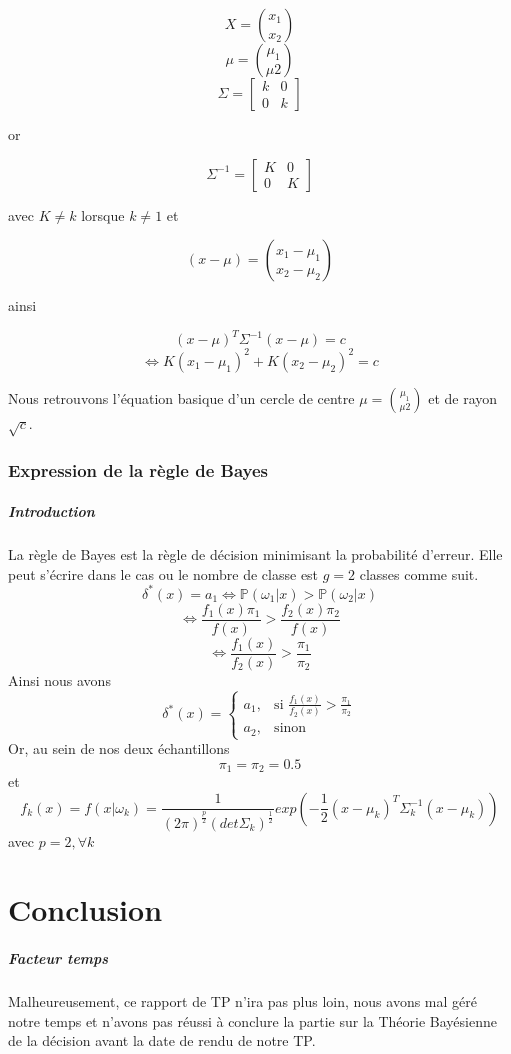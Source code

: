 \documentclass{report}
\begin{document}
$$ X = \binom{x_1}{x_2} $$
$$ \mu = \binom{\mu_1}{\mu2}$$
$$ \Sigma = \begin{bmatrix} k & 0\\ 0 & k \end{bmatrix}$$

or

$$ \Sigma^{-1} = \begin{bmatrix} K & 0\\ 0 & K \end{bmatrix}$$

avec $K \neq k$ lorsque $k \neq 1$ et

$$(x - \mu) = \binom{x_1 - \mu_1}{x_2 - \mu_2}$$

ainsi

$$(x - \mu)^T\Sigma^{-1}(x - \mu) = c$$
$$\Leftrightarrow K(x_1 - \mu_1)^2 + K(x_2 - \mu_2)^2 = c$$

Nous retrouvons l'équation basique d'un cercle de centre $\mu = \binom{\mu_1}{\mu2}$ et de rayon $\sqrt{c}$.

\subsection{Expression de la règle de Bayes}
\paragraph{Introduction}
La règle de Bayes est la règle de décision minimisant la probabilité d'erreur. Elle peut s'écrire dans le cas ou le nombre de classe est $g = 2$ classes comme suit.
$$\delta^{*}(x) = a_1 \Leftrightarrow \mathbb{P}(\omega_1 | x) > \mathbb{P} (\omega_2 | x)$$
$$\Leftrightarrow \frac{f_1(x) \pi_1}{f(x)} > \frac{f_2(x) \pi_2}{f(x)}$$
$$\Leftrightarrow \frac{f_1(x)}{f_2(x)} > \frac{\pi_1}{\pi_2}$$
Ainsi nous avons
$$\delta^{*}(x) =
    \begin{cases}
        a_1, & \text{si }\frac{f_1(x)}{f_2(x)} > \frac{\pi_1}{\pi_2} \\
        a_2, & \text{sinon}
    \end{cases}
$$
Or, au sein de nos deux échantillons
$$\pi_1 = \pi_2 = 0.5$$
et
$$f_k(x) = f(x | \omega_k) = \frac{1}{(2\pi)^{\frac{p}{2}}(det \Sigma_k)^{\frac{1}{2}}}exp(-\frac{1}{2}(x - \mu_k)^T\Sigma_k^{-1}(x - \mu_k))$$
avec $p = 2, \forall k$


\chapter{Conclusion}
\paragraph{Facteur temps}
Malheureusement, ce rapport de TP n'ira pas plus loin, nous avons mal géré notre temps et n'avons pas réussi à conclure la partie sur la Théorie Bayésienne de la décision avant la date de rendu de notre TP.
\end{document}
